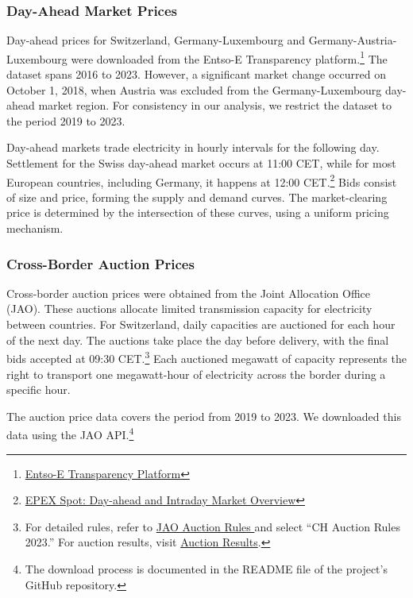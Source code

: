 \documentclass[12pt]{article}
\begin{document}
\subsubsection*{Day-Ahead Market Prices}

Day-ahead prices for Switzerland, Germany-Luxembourg and Germany-Austria-Luxembourg were downloaded from the Entso-E Transparency platform.\footnote{\href{https://transparency.entsoe.eu/}{Entso-E Transparency Platform}} The dataset spans 2016 to 2023. However, a significant market change occurred on October 1, 2018, when Austria was excluded from the Germany-Luxembourg day-ahead market region. For consistency in our analysis, we restrict the dataset to the period 2019 to 2023.

Day-ahead markets trade electricity in hourly intervals for the following day. Settlement for the Swiss day-ahead market occurs at 11:00 CET, while for most European countries, including Germany, it happens at 12:00 CET.\footnote{\href{https://www.epexspot.com/en/basicspowermarket\#day-ahead-and-intraday-the-backbone-of-the-european-spot-market}{EPEX Spot: Day-ahead and Intraday Market Overview}} Bids consist of size and price, forming the supply and demand curves. The market-clearing price is determined by the intersection of these curves, using a uniform pricing mechanism.

\subsubsection*{Cross-Border Auction Prices}

Cross-border auction prices were obtained from the Joint Allocation Office (JAO). These auctions allocate limited transmission capacity for electricity between countries. For Switzerland, daily capacities are auctioned for each hour of the next day. The auctions take place the day before delivery, with the final bids accepted at 09:30 CET.\footnote{For detailed rules, refer to \href{https://www.jao.eu/resource-center/auction-rules}{JAO Auction Rules \citep{AllocationRules2023}} and select ``CH Auction Rules 2023.'' For auction results, visit \href{https://www.jao.eu/auctions\#/}{Auction Results}.} Each auctioned megawatt of capacity represents the right to transport one megawatt-hour of electricity across the border during a specific hour.

The auction price data covers the period from 2019 to 2023. We downloaded this data using the JAO API.\footnote{The download process is documented in the README file of the project's GitHub repository.}
\end{document}
